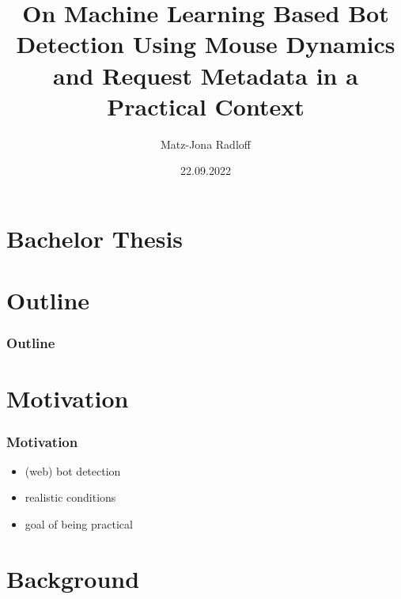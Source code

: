 \documentclass[t,aspectratio=169,table]{beamer}
\title{On Machine Learning Based Bot Detection Using Mouse Dynamics and Request Metadata in a Practical Context}
\author{Matz-Jona Radloff}
\date{22.09.2022} %
\begin{document}
\section{Bachelor Thesis}
\begin{frame}
\maketitle
\end{frame}

\section{Outline}
\begin{frame}
\frametitle{Outline}

\tableofcontents
\end{frame}

\section{Motivation}
\begin{frame}
\frametitle{Motivation}

\begin{itemize}
    \item (web) bot detection
    \item realistic conditions
    \item goal of being practical
\end{itemize}

\end{frame}

\section{Background}
\end{document}
